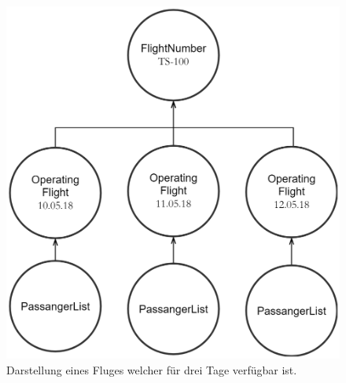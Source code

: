 \begin{figure}
    \centering
    \includegraphics[width=0.65\linewidth]{gfx/implementation/FlightNumberSample}
    \caption{Darstellung eines Fluges welcher für drei Tage verfügbar ist.}
    \label{fig:implementation:entityFlightNumber}
\end{figure} 

